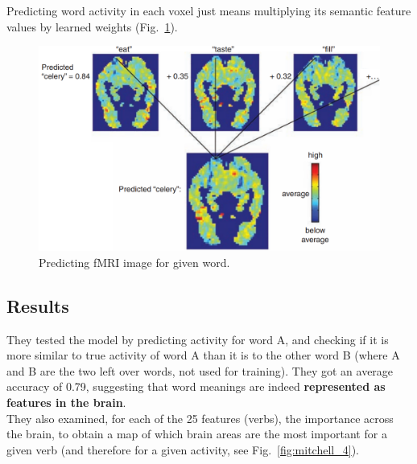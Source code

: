 
Predicting word activity in each voxel just means multiplying its semantic feature values by learned weights (Fig.~\ref{fig:mitchell_3}).
\begin{figure}[!ht]
    \centering
    \includegraphics[width=0.6\linewidth]{images/mitchell_3.png}
    \caption{Predicting fMRI image for given word.}
    \label{fig:mitchell_3}
\end{figure}

\subsection{Results}
They tested the model by predicting activity for word A, and checking if it is more similar to true activity of word A than it is to the other word B (where A and B are the two left over words, not used for training). They got an average accuracy of 0.79, suggesting that word meanings are indeed \textbf{represented as features in the brain}.\\

They also examined, for each of the 25 features (verbs), the importance across the brain, to obtain a map of which brain areas are the most important for a given verb (and therefore for a given activity, see Fig.~\ref{fig:mitchell_4}).\\


